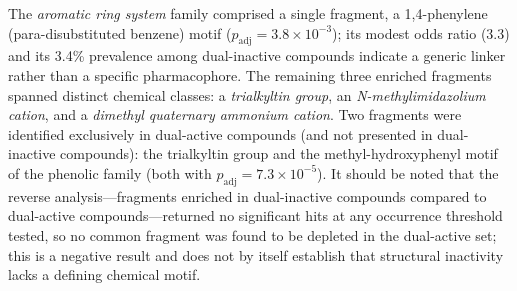 \documentclass[letterpaper]{article}
\begin{document}
The \emph{aromatic ring system} family comprised a single fragment, a
1,4-phenylene (para-disubstituted benzene) motif ($p_{\text{adj}} = 3.8 \times 10^{-3}$);
its modest odds ratio (3.3) and its 3.4\% prevalence among dual-inactive
compounds indicate a generic linker rather than a specific pharmacophore.
The remaining three enriched fragments spanned distinct chemical classes: a
\emph{trialkyltin group}, an \emph{\textit{N}-methylimidazolium cation}, and a
\emph{dimethyl quaternary ammonium cation}. Two fragments were identified
exclusively in dual-active compounds (and not presented in dual-inactive
compounds): the trialkyltin group and the methyl-hydroxyphenyl motif of the
phenolic family (both with $p_{\text{adj}} = 7.3 \times 10^{-5}$).
It should be noted that the reverse analysis---fragments enriched in dual-inactive
compounds compared to dual-active compounds---returned no significant hits at any
occurrence threshold tested, so no common fragment was found to be depleted in the
dual-active set; this is a negative result and does not by itself establish that
structural inactivity lacks a defining chemical motif.
\end{document}
